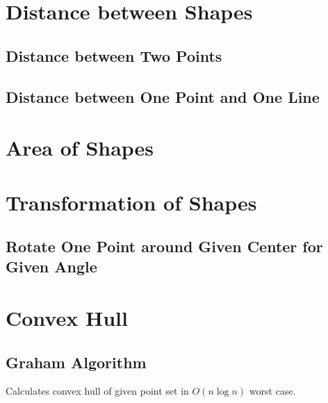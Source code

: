 \section{Distance between Shapes}

\subsection{Distance between Two Points}



\subsection{Distance between One Point and One Line}




\section{Area of Shapes}


\section{Transformation of Shapes}

\subsection{Rotate One Point around Given Center for Given Angle}




\section{Convex Hull}

\subsection{Graham Algorithm}

Calculates convex hull of given point set in $O(n\log{n})$ worst case.


